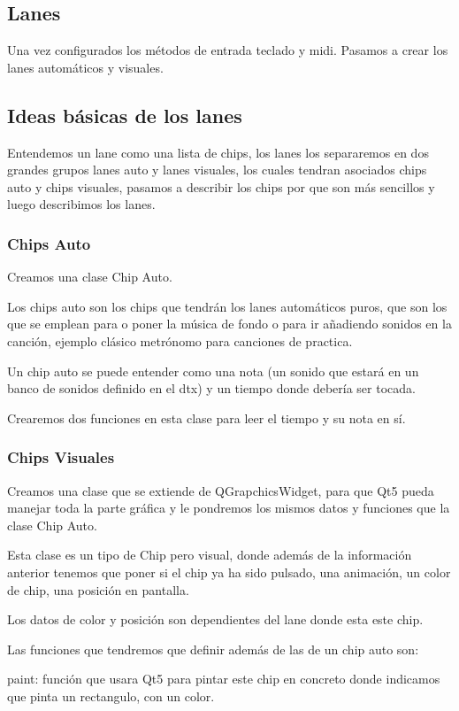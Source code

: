\documentclass[a4paper,11pt,oneside]{book}
\begin{document}
\subsection{Lanes}
 Una vez configurados los métodos de entrada teclado y midi. Pasamos a crear los lanes automáticos y visuales.

\subsection{Ideas básicas de los lanes}
Entendemos un lane como una lista de chips, los lanes los separaremos en dos grandes grupos lanes auto y lanes visuales, los cuales tendran asociados chips auto y chips visuales, pasamos a describir los chips por que son más sencillos y luego describimos los lanes.

\subsubsection{Chips Auto}
Creamos una clase Chip Auto.

Los chips auto son los chips que tendrán los lanes automáticos puros, que son los que se emplean para o poner la música de fondo o para ir añadiendo sonidos en la canción, ejemplo clásico metrónomo para canciones de practica.

Un chip auto se puede entender como una nota (un sonido que estará en un banco de sonidos definido en el dtx) y un tiempo donde debería ser tocada.

Crearemos dos funciones en esta clase para leer el tiempo y su nota en sí.

\subsubsection{Chips Visuales}
Creamos una clase que se extiende de QGrapchicsWidget, para que Qt5 pueda manejar toda la parte gráfica y le pondremos los mismos datos y funciones que la clase Chip Auto.

Esta clase es un tipo de Chip pero visual, donde además de la información anterior tenemos que poner si el chip ya ha sido pulsado, una animación, un color de chip, una posición en pantalla.

Los datos de color y posición son dependientes del lane donde esta este chip.

Las funciones que tendremos que definir además de las de un chip auto son:


paint: función que usara Qt5 para pintar este chip en concreto donde indicamos que pinta un rectangulo, con un color.
\end{document}
